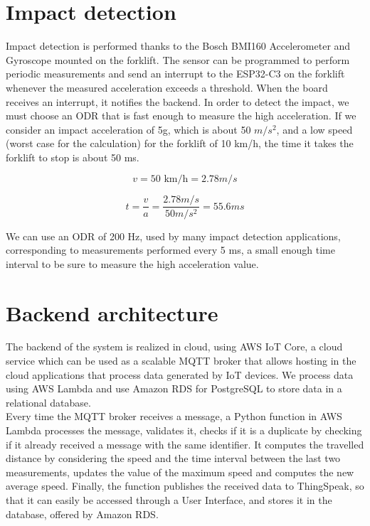 \section{Impact detection}
Impact detection is performed thanks to the Bosch BMI160 Accelerometer and Gyroscope mounted on the forklift. The sensor can be programmed to perform periodic measurements and send an interrupt to the ESP32-C3 on the forklift whenever the measured acceleration exceeds a threshold. When the board receives an interrupt, it notifies the backend. In order to detect the impact, we must choose an ODR that is fast enough to measure the high acceleration.  If we consider an impact acceleration of 5g, which is about 50 $m/s^2$, and a low  speed (worst case for the calculation) for the forklift of 10 km/h, the time it takes the forklift to stop is about 50 ms.

\begin{equation}
v = 50 \text{ km/h} = 2.78 m/s
\end{equation}

\begin{equation}
t = \frac{v}{a} = \frac{2.78 m/s}{50 m/s^2} = 55.6 ms
\end{equation}

We can use an ODR of 200 Hz, used by many impact detection applications, corresponding to measurements performed every 5 ms, a small enough time interval to be sure to measure the high acceleration value.

\section{Backend architecture}
The backend of the system is realized in cloud, using AWS IoT Core, a cloud service which can be used as a scalable MQTT broker that allows hosting in the cloud applications that process data generated by IoT devices. We process data using AWS Lambda and use Amazon RDS for PostgreSQL to store data in a relational database.\\
Every time the MQTT broker receives a message, a Python function in AWS Lambda processes the message, validates it, checks if it is a duplicate by checking if it already received a message with the same identifier. It computes the travelled distance by considering the speed and the time interval between the last two measurements, updates the value of the maximum speed and computes the new average speed. Finally, the function publishes the received data to ThingSpeak, so that it can easily be accessed through a User Interface, and stores it in the database, offered by Amazon RDS.

